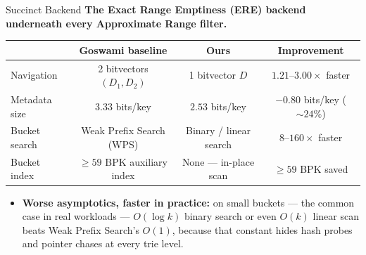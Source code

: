 \begin{frame}[c]{Succinct Backend}
    \textbf{The Exact Range Emptiness (ERE) backend underneath every Approximate Range filter.}
    \medskip
    \begin{table}
        \centering
        \footnotesize
        \setlength{\tabcolsep}{4pt}
        \begin{tabular*}{0.95\textwidth}{@{\extracolsep{\fill}}lccc@{}}
            \toprule
            & \textbf{Goswami baseline}          & \textbf{Ours}                                  & \textbf{Improvement}                 \\
            \midrule
            Navigation      & 2 bitvectors $(D_1, D_2)$          & 1 bitvector $D$                       & $1.21$--$3.00\times$ faster \\
            Metadata size    & $3.33$ bits/key                    & $2.53$ bits/key                       & $-0.80$ bits/key ($\sim 24\%$)            \\
            Bucket search   & Weak Prefix Search (WPS) & Binary / linear search & $8$--$160\times$ faster     \\
            Bucket index    & $\ge 59$ BPK auxiliary index & None --- in-place scan & $\ge 59$ BPK saved          \\
            \bottomrule
        \end{tabular*}\label{tab:ere-table}
    \end{table}
    \medskip
    \begin{itemize}
        \setlength{\itemsep}{0.4em}
        \item \textbf{Worse asymptotics, faster in practice:} on small buckets --- the common case
        in real workloads --- $O(\log k)$ binary search or even $O(k)$ linear scan beats Weak Prefix
        Search's $O(1)$, because that constant hides hash probes and pointer chases at every trie level.
    \end{itemize}
\end{frame}